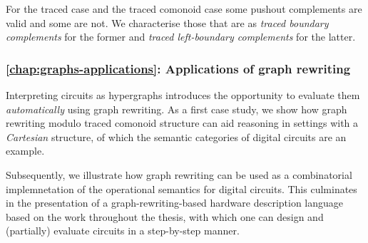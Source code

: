 For the traced case and the traced comonoid case some pushout complements are
valid and some are not.
We characterise those that are as \emph{traced boundary complements} for the
former and \emph{traced left-boundary complements} for the latter.

\subsubsection{\cref{chap:graphs-applications}: Applications of graph rewriting}

Interpreting circuits as hypergraphs introduces the opportunity to evaluate them
\emph{automatically} using graph rewriting.
As a first case study, we show how graph rewriting modulo traced comonoid
structure can aid reasoning in settings with a \emph{Cartesian} structure, of
which the semantic categories of digital circuits are an example.

Subsequently, we illustrate how graph rewriting can be used as a combinatorial
implemnetation of the operational semantics for digital circuits.
This culminates in the presentation of a graph-rewriting-based hardware
description language based on the work throughout the thesis, with which one can
design and (partially) evaluate circuits in a step-by-step manner.